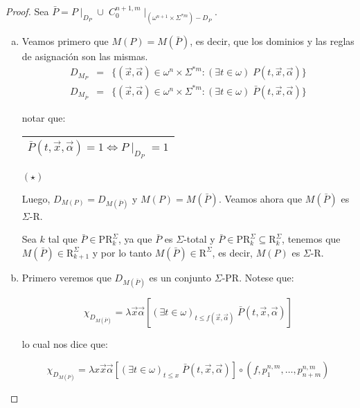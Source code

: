   \begin{proof}
    \PN Sea $\bar{P} = P \mid_{D_{P}} \cup \; C_{0}^{n+1,m} \mid_{(\omega^{n+1} \times \Sigma^{\ast m})-D_{P}}$.
    \begin{enumerate}[a)]
      \item Veamos primero que $M(P) = M(\bar{P})$, es decir, que los dominios y las reglas de asignación son las
        mismas.
        \begin{eqnarray*}
          D_{M_{P}} &=& \{(\vec{x},\vec{\alpha}) \in \omega^{n} \times \Sigma^{\ast m}: (\exists t \in \omega)
            \; P(t,\vec{x},\vec{\alpha})\} \\
          D_{M_{\bar{P}}} &=& \{(\vec{x},\vec{\alpha}) \in \omega^{n} \times \Sigma^{\ast m}: (\exists t \in
            \omega) \; \bar{P}(t,\vec{x},\vec{\alpha})\}
        \end{eqnarray*}

        \PN notar que:

        \begin{center} \begin{tabular}{|c|} \hline $\bar{P}(t,\vec{x},\vec{\alpha}) = 1 \Leftrightarrow P \mid_{D_{P}} =
        1$ \\\hline \end{tabular} $(\star)$ \end{center}

        \PN Luego, $D_{M(P)} = D_{M(\bar{P})}$ y $M(P) = M(\bar{P})$. Veamos ahora que $M(\bar{P})$ es $\Sigma$-R.

        \PN Sea $k$ tal que $\bar{P} \in \mathrm{PR}_{k}^{\Sigma}$, ya que $\bar{P}$ es $\Sigma$-total y $\bar{P} \in
        \mathrm{PR}_{k}^{\Sigma} \subseteq \mathrm{R}_{k}^{\Sigma}$, tenemos que $M(\bar{P}) \in
        \mathrm{R}_{k+1}^{\Sigma}$ y por lo tanto $M(\bar{P}) \in \mathrm{R}^{\Sigma}$, es decir, $M(P)$ es $\Sigma$-R.

      \item Primero veremos que $D_{M(\bar{P})}$ es un conjunto $\Sigma$-PR. Notese que:

        \[
          \chi_{D_{M(\bar{P})}} = \lambda \vec{x}\vec{\alpha} \left[(\exists t \in \omega)_{t \leq
          f(\vec{x},\vec{\alpha})} \; \bar{P}(t,\vec{x},\vec{\alpha})\right]
        \]

        \PN lo cual nos dice que:

        \[
          \chi_{D_{M(\bar{P})}} = \lambda x\vec{x}\vec{\alpha} \left[(\exists t \in \omega)_{t\leq x} \;
          \bar{P}(t,\vec{x},\vec{\alpha})\right] \circ (f,p_{1}^{n,m},\dotsc,p_{n+m}^{n,m})
        \]


\end{enumerate}
\end{proof}
